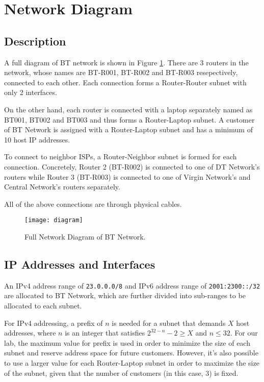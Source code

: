 \section{Network Diagram}
\label{sec:diagram}

\subsection{Description}

A full diagram of BT network is shown in Figure \ref{fig:diagram}.
There are 3 routers in the network, whose names are BT-R001, BT-R002 and BT-R003 resepectively, connected to each other. 
Each connection forms a Router-Router subnet with only 2 interfaces.

On the other hand, each router is connected with a laptop separately named as BT001, BT002 and BT003 and thus forms a Router-Laptop subnet.
A customer of BT Network is assigned with a Router-Laptop subnet and has a minimum of 10 host IP addresses.

To connect to neighbor ISPs, a Router-Neighbor subnet is formed for each connection. Concretely, Router 2 (BT-R002) is connected to one of DT Network's routers while Router 3 (BT-R003) is connected to one of Virgin Network's and Central Network's routers separately.

All of the above connections are through physical cables.

\begin{landscape}
\begin{figure}[t!]
    \centering
    \texttt{[image: diagram]}
    \caption{Full Network Diagram of BT Network.}
    \label{fig:diagram}
\end{figure}
\end{landscape}




\subsection{IP Addresses and Interfaces}

An IPv4 address range of \texttt{23.0.0.0/8} and IPv6 address range of \texttt{2001:2300::/32} are allocated to BT Network, which are further divided into sub-ranges to be allocated to each subnet.

For IPv4 addressing, a prefix of $n$ is needed for a subnet that demands $X$ host addresses, where $n$ is an integer that satisfies $2^{32-n} - 2 \geq X$ and $n \leq 32$. For our lab, the maximum value for prefix is used in order to minimize the size of each subnet and reserve address space for future customers. However, it's also possible to use a larger value for each Router-Laptop subnet in order to maximize the size of the subnet, given that the number of customers (in this case, $3$) is fixed.

